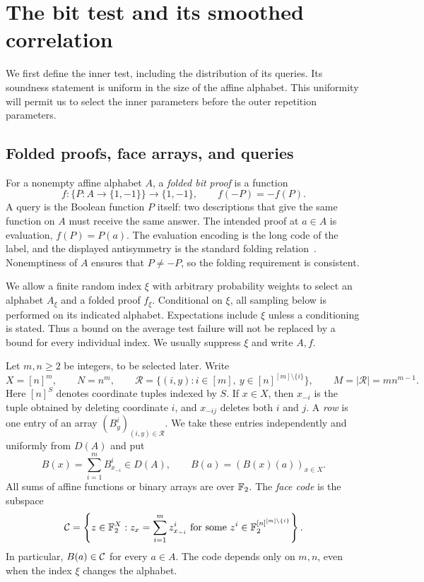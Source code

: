 \section{The bit test and its smoothed correlation}
\label{sec:inner-smoothing}

We first define the inner test, including the distribution of its queries.
Its soundness statement is uniform in the size of the affine alphabet.
This uniformity will permit us to select the inner parameters before the
outer repetition parameters.

\subsection{Folded proofs, face arrays, and queries}

For a nonempty affine alphabet $A$, a \emph{folded bit proof} is a function
\[
 f:\{P:A\to\{1,-1\}\}\longrightarrow\{1,-1\},
 \qquad f(-P)=-f(P).
\]
A query is the Boolean function $P$ itself: two descriptions that give the
same function on $A$ must receive the same answer. The intended proof at
$a\in A$ is evaluation, $f(P)=P(a)$. The evaluation encoding is the
long code of the label, and the displayed antisymmetry is the standard
folding relation~\cite{BGS1998,Hastad2001}. Nonemptiness of $A$ ensures that
$P\ne-P$, so the folding requirement is consistent.

We allow a finite random index $\xi$ with arbitrary probability weights to
select an alphabet $A_\xi$ and a folded proof $f_\xi$. Conditional on $\xi$,
all sampling below is performed on its indicated alphabet. Expectations
include $\xi$ unless a conditioning is stated. Thus a bound on the average
test failure will not be replaced by a bound for every individual index.
We usually suppress $\xi$ and write $A,f$.

Let $m,n\ge2$ be integers, to be selected later. Write
\[
 X=[n]^m,\qquad N=n^m,\qquad
 \mathcal R=\{(i,y):i\in[m],\ y\in[n]^{[m]\setminus\{i\}}\},
 \qquad M=|\mathcal R|=mn^{m-1}.
\]
Here $[n]^S$ denotes coordinate tuples indexed by $S$. If $x\in X$, then
$x_{-i}$ is the tuple obtained by deleting coordinate $i$, and $x_{-ij}$
deletes both $i$ and $j$. A \emph{row} is one entry of an array
$(B^i_y)_{(i,y)\in\mathcal R}$. We take these entries independently and
uniformly from $D(A)$ and put
\begin{equation}\label{eq:face-array}
 B(x)=\sum_{i=1}^m B^i_{x_{-i}}\in D(A),
 \qquad B(a)=(B(x)(a))_{x\in X}.
\end{equation}
All sums of affine functions or binary arrays are over $\mathbb F_2$. The
\emph{face code} is the subspace
\begin{equation}\label{eq:face-code}
 \mathcal C=\left\{z\in\mathbb F_2^X:
 z_x=\sum_{i=1}^m z^i_{x_{-i}}
 \text{ for some }z^i\in\mathbb F_2^{[n]^{[m]\setminus\{i\}}}\right\}.
\end{equation}
In particular, $B(a)\in\mathcal C$ for every $a\in A$. The code depends only on
$m,n$, even when the index $\xi$ changes the alphabet.

